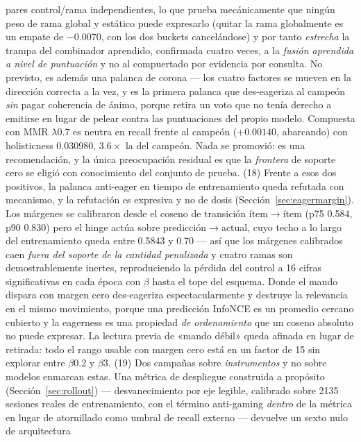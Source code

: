 \documentclass[11pt]{article}
\begin{document}
pares control/rama independientes, lo que prueba mecánicamente que ningún peso de
rama global y estático puede expresarlo (quitar la rama globalmente es un empate de
$-\num{0.0070}$, con los dos buckets cancelándose) y por tanto \emph{estrecha} la
trampa del combinador aprendido, confirmada cuatro veces, a la \emph{fusión
aprendida a nivel de puntuación} y no al compuertado por evidencia por consulta. No
previsto, es además una palanca de corona --- los cuatro factores se mueven en la
dirección correcta a la vez, y es la primera palanca que des-eageriza al campeón
\emph{sin} pagar coherencia de ánimo, porque retira un voto que no tenía derecho a
emitirse en lugar de pelear contra las puntuaciones del propio modelo. Compuesta con
MMR $\lambda\num{0.7}$ es neutra en recall frente al campeón ($+\num{0.00140}$,
abarcando) con holisticness \num{0.030980}, $\num{3.6}\times$ la del campeón. Nada
se promovió: es una recomendación, y la única preocupación residual es que la
\emph{frontera} de soporte cero se eligió con conocimiento del conjunto de prueba.
(18) Frente a esos dos positivos, la palanca anti-eager en tiempo de entrenamiento
queda refutada con mecanismo, y la refutación es expresiva y no de dosis
(Sección~\ref{sec:eagermargin}). Los márgenes se calibraron desde el coseno de
transición ítem$\to$ítem (p75 \num{0.584}, p90 \num{0.830}) pero el hinge actúa
sobre predicción$\to$actual, cuyo techo a lo largo del entrenamiento queda entre
\num{0.5843} y \num{0.70} --- así que los márgenes calibrados caen \emph{fuera del
soporte de la cantidad penalizada} y cuatro ramas son demostrablemente inertes,
reproduciendo la pérdida del control a \num{16} cifras significativas en cada época
con $\beta$ hasta el tope del esquema. Donde el mando dispara con margen cero
des-eageriza espectacularmente y destruye la relevancia en el mismo movimiento,
porque una predicción InfoNCE es un promedio cercano cubierto y la eagerness es una
propiedad \emph{de ordenamiento} que un coseno absoluto no puede expresar. La
lectura previa de «mando débil» queda afinada en lugar de retirada: todo el rango
usable con margen cero está en un factor de \num{15} sin explorar entre
$\beta\num{0.2}$ y $\beta\num{3}$.
(19) Dos campañas sobre \emph{instrumentos} y no sobre modelos enmarcan estas. Una
métrica de despliegue construida a propósito (Sección~\ref{sec:rollout}) ---
desvanecimiento por eje legible, calibrado sobre \num{2135} sesiones reales de
entrenamiento, con el término anti-gaming \emph{dentro} de la métrica en lugar de
atornillado como umbral de recall externo --- devuelve un sexto nulo de arquitectura
\end{document}
